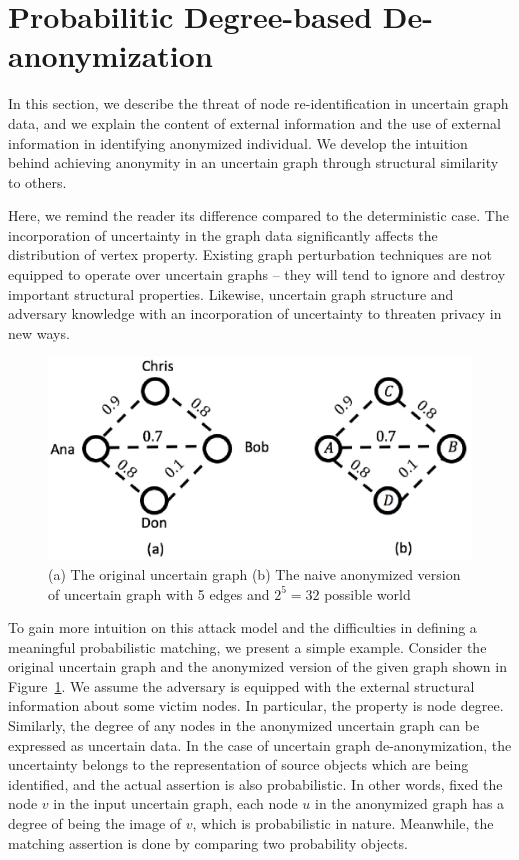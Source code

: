 \section{Probabilitic Degree-based De-anonymization}
In this section, we describe the threat of node re-identification in uncertain graph data, and we explain the content of external information and the use of external information in identifying anonymized individual. We develop the intuition behind achieving anonymity in an uncertain graph through structural similarity to others. 

Here, we remind the reader its difference compared to the deterministic case. The incorporation of uncertainty in the graph data significantly affects the distribution of vertex property. Existing graph perturbation techniques are not equipped to operate over uncertain graphs -- they will tend to ignore and destroy important structural properties. Likewise, uncertain graph structure and adversary knowledge with an incorporation of uncertainty to threaten privacy in new ways. 

\begin{figure}[t!]
    \centering 
    \includegraphics[scale=0.5]{figures/DegreeDistAUG/uncertainExample.eps}
    \caption{\small{(a) The original uncertain graph (b) The naive anonymized version of uncertain graph with 5 edges and $2^{5}=32$ possible world}}
    \label{fig:ddAUG:uncertainGraph}
\end{figure}

To gain more intuition on this attack model and the difficulties in defining a meaningful probabilistic matching, we present a simple example. Consider the original uncertain graph and the anonymized version of the given graph shown in Figure~\ref{fig:ddAUG:uncertainGraph}. We assume the adversary is equipped with the external structural information about some victim nodes. In particular, the property is node degree. Similarly, the degree of any nodes in the anonymized uncertain graph can be expressed as uncertain data. In the case of uncertain graph de-anonymization, the uncertainty belongs to the representation of source objects which are being identified, and the actual assertion is also probabilistic. In other words, fixed the node $v$ in the input uncertain graph, each node $u$ in the anonymized graph has a degree of being the image of $v$, which is probabilistic in nature. Meanwhile, the matching assertion is done by comparing two probability objects. 

